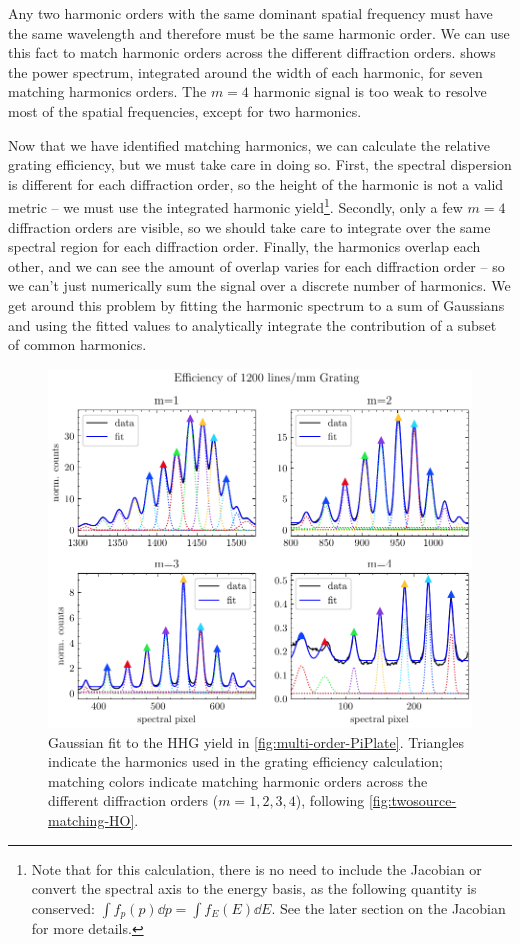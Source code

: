 Any two harmonic orders with the same dominant spatial frequency must have the same wavelength and therefore must be the same harmonic order. We can use this fact to match harmonic orders across the different diffraction orders.  shows the power spectrum, integrated around the width of each harmonic, for seven matching harmonics orders. The $m=4$ harmonic signal is too weak to resolve most of the spatial frequencies, except for two harmonics.

Now that we have identified matching harmonics, we can calculate the relative grating efficiency, but we must take care in doing so. First, the spectral dispersion is different for each diffraction order, so the height of the harmonic is not a valid metric -- we must use the integrated harmonic yield\footnote{Note that for this calculation, there is no need to include the Jacobian or convert the spectral axis to the energy basis, as the following quantity is conserved: $\int f_p(p) \dd{p} = \int f_E(E) \dd{E}$. See the later section on the Jacobian for more details.}. Secondly, only a few $m=4$ diffraction orders are visible, so we should take care to integrate over the same spectral region for each diffraction order. Finally, the harmonics overlap each other, and we can see the amount of overlap varies for each diffraction order -- so we can't just numerically sum the signal over a discrete number of harmonics. We get around this problem by fitting the harmonic spectrum to a sum of Gaussians and using the fitted values to analytically integrate the contribution of a subset of common harmonics.

\begin{figure}
	\centering
	\includegraphics[width=1.0\textwidth]{figures/chap2/grating-efficiency.pdf}
	\caption{Gaussian fit to the HHG yield in \cref{fig:multi-order-PiPlate}. Triangles indicate the harmonics used in the grating efficiency calculation; matching colors indicate matching harmonic orders across the different diffraction orders ($m=1,2,3,4$), following \cref{fig:twosource-matching-HO}.}
	\label{fig:grating-efficiency}
\end{figure}

